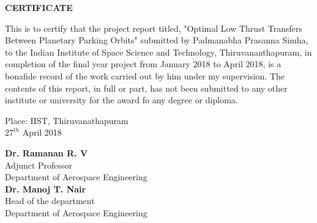 
\begin{dedication} 
\vspace*{-1.5in}
\begin{center}
\textbf{{\large CERTIFICATE}}
\end{center}
\vspace*{0.5in}
\noindent This is to certify that the project report titled, "Optimal Low Thrust Transfers Between Planetary Parking Orbits" submitted by Padmanabha Prasanna Simha, to the Indian Institute of Space Science and Technology, Thiruvananthapuram, in completion of the final year project from January 2018 to April 2018, is a bonafide record of the work carried out by him under my supervision. The contents of this report, in full or part, has not been submitted to any other institute or university for the award fo any degree or diploma.
%

\vspace*{1.25in}
\noindent
\begin{minipage}{\textwidth}
\begin{minipage}{0.49\linewidth}
\begin{flushleft}
	\vspace{1.90in}
Place: IIST, Thiruvanathapuram\\
$27^{th}$ April 2018

 \end{flushleft}
  \end{minipage}
  \begin{minipage}{0.49\linewidth}
 \begin{flushright}

 {\bf Dr. Ramanan R. V} \\
Adjunct Professor \\ 
Department of Aerospace Engineering\\
\vspace{1in}
 {\bf Dr. Manoj T. Nair} \\
  Head of the department \\ 
   Department of Aerospace Engineering\\

 \end{flushright}
  \end{minipage}
 \end{minipage}



%


\end{dedication}